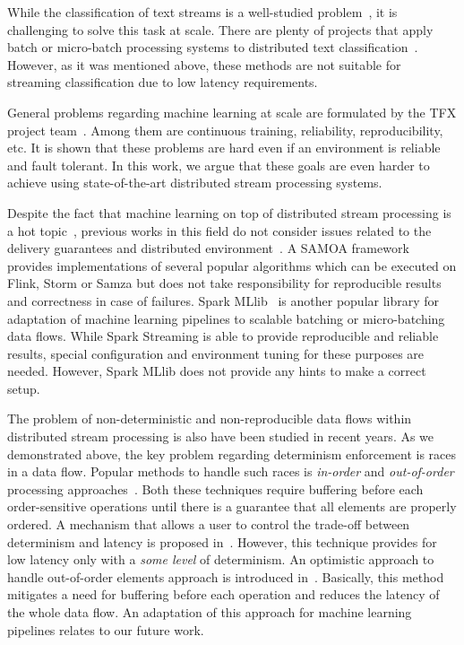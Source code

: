 \label{fs-related}

While the classification of text streams is a well-studied problem~\cite{zhang2008one, tampakas2005}, it is challenging to solve this task at scale. There are plenty of projects that apply batch or micro-batch processing systems to distributed text classification~\cite{semberecki2016distributed, 8029336, baltas2016apache, svyatkovskiy2016large}. However, as it was mentioned above, these methods are not suitable for streaming classification due to low latency requirements. 

General problems regarding machine learning at scale are formulated by the TFX project team~\cite{Baylor:2017:TTP:3097983.3098021}. Among them are continuous training, reliability, reproducibility, etc. It is shown that these problems are hard even if an environment is reliable and fault tolerant. In this work, we argue that these goals are even harder to achieve using state-of-the-art distributed stream processing systems.

Despite the fact that machine learning on top of distributed stream processing is a hot topic~\cite{qiu2016survey}, previous works in this field do not consider issues related to the delivery guarantees and distributed environment~\cite{khumoyun2016real}. A SAMOA framework~\cite{morales2015samoa} provides implementations of several popular algorithms which can be executed on Flink, Storm or Samza but does not take responsibility for reproducible results and correctness in case of failures. Spark MLlib~\cite{meng2016mllib} is another popular library for adaptation of machine learning pipelines to scalable batching or micro-batching data flows. While Spark Streaming is able to provide reproducible and reliable results, special configuration and environment tuning for these purposes are needed. However, Spark MLlib does not provide any hints to make a correct setup. 

The problem of non-deterministic and non-reproducible data flows within distributed stream processing is also have been studied in recent years.  As we demonstrated above, the key problem regarding determinism enforcement is races in a data flow. Popular methods to handle such races is {\em in-order} and {\em out-of-order} processing approaches~\cite{Li:2008:OPN:1453856.1453890}. Both these techniques require buffering before each order-sensitive operations until there is a guarantee that all elements are properly ordered. A mechanism that allows a user to control the trade-off between determinism and latency is proposed in~\cite{Doulkeridis:2014:SLA:2628707.2628782}. However, this technique provides for low latency only with a {\em some level} of determinism. An optimistic approach to handle out-of-order elements approach is introduced in~\cite{we2018seim}. Basically, this method mitigates a need for buffering before each operation and reduces the latency of the whole data flow. An adaptation of this approach for machine learning pipelines relates to our future work.


